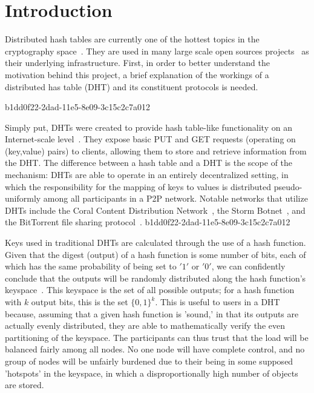 \documentclass[12pt]{article}
\begin{document}
\section{Introduction}
\par Distributed hash tables are currently one of the hottest topics in the cryptography space~\cite{Stoica:2001dj,Rowstron:2001ea,Ratnasamy:2001wn}. They are used in many large scale open sources projects~\cite{Freitas:2013tb,Xu:2010vs,Perfitt:2010fh} as their underlying infrastructure. First, in order to better understand the motivation behind this project, a brief explanation of the workings of a distributed has table (DHT) and its constituent protocols is needed.

b1dd0f22-2dad-11e5-8e09-3c15c2c7a012\par Simply put, DHTs were created to provide hash table-like functionality on an Internet-scale level~\cite{Ratnasamy:2001wn}. They expose basic PUT and GET requests (operating on (key,value) pairs) to clients, allowing them to store and retrieve information from the DHT. The difference between a hash table and a DHT is the scope of the mechanism: DHTs are able to operate in an entirely decentralized setting, in which the responsibility for the mapping of keys to values is distributed pseudo-uniformly among all participants in a P2P network. Notable networks that utilize DHTs include the Coral Content Distribution Network~\cite{Freedman:2004vb}, the Storm Botnet~\cite{Holz:2008uk}, and the BitTorrent file sharing protocol~\cite{Cohen:y1_8mBnw}.
b1dd0f22-2dad-11e5-8e09-3c15c2c7a012
\par Keys used in traditional DHTs are calculated through the use of a hash function. Given that the digest (output) of a hash function is some number of bits, each of which has the same probability of being set to $'1'$ or $'0'$, we can confidently conclude that the outputs will be randomly distributed along the hash function's keyspace~. This keyspace is the set of all possible outputs; for a hash function with $k$ output bits, this is the set $\{0,1\}^k$. This is useful to users in a DHT because, assuming that a given hash function is 'sound,' in that its outputs are actually evenly distributed, they are able to mathematically verify the even partitioning of the keyspace. The participants can thus trust that the load will be balanced fairly among all nodes. No one node will have complete control, and no group of nodes will be unfairly burdened due to their being in some supposed 'hotspots' in the keyspace, in which a disproportionally high number of objects are stored.~
\end{document}
